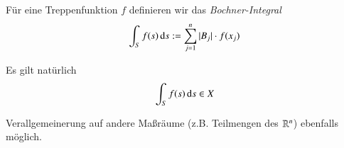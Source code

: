 \begin{defi}\label{4.20}
    Für eine Treppenfunktion $f$ definieren wir das \textit{Bochner-Integral}
    \[
        \int_S f(s)\, \mathrm{d} s:= \sum_{j=1}^n|B_j|\cdot f(x_j)
    \]
\end{defi}

\begin{remark}
    Es gilt natürlich
    \[
        \int_S f(s)\, \mathrm{d} s \in X
    \]
\end{remark}
\begin{remark}
    Verallgemeinerung auf andere Maßräume (z.B. Teilmengen des $\mathbb{R}^n$) ebenfalls möglich.
\end{remark}

